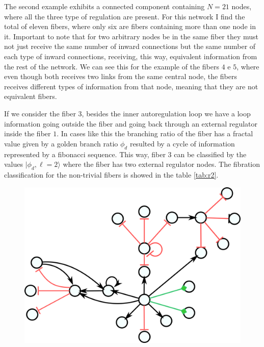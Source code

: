 \documentclass[12pt]{diazessay} %
\begin{document}
The second example exhibits a connected component containing $N = 21$ nodes, where all the three type of regulation are present. For this network I find the total of eleven fibers, where only six are fibers containing more than one node in it. Important to note that for two arbitrary nodes be in the same fiber they must not just receive the same number of inward connections but the same number of each type of inward connections, receiving, this way, equivalent information from the rest of the network. We can see this for the example of the fibers $4$ e $5$, where even though both receives two links from the same central node, the fibers receives different types of information from that node, meaning that they are not equivalent fibers.

If we consider the fiber $3$, besides the inner autoregulation loop we have a loop information going outside the fiber and going back through an external regulator inside the fiber $1$. In cases like this the branching ratio of the fiber has a fractal value given by a golden branch ratio $\phi_d$ resulted by a cycle of information represented by a fibonacci sequence. This way, fiber $3$ can be classified by the values $| \phi_d, \ell = 2 \rangle$ where the fiber has two external regulator nodes. The fibration classification for the non-trivial fibers is showed in the table \ref{tab:r2}.


\begin{figure}[H]
	\centering
	\includegraphics[scale=0.275]{Figures/result2.png}
\end{figure}
\end{document}
